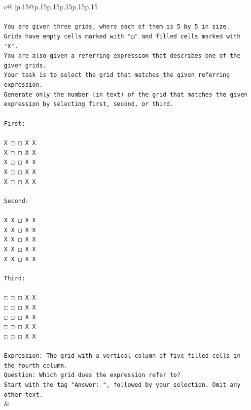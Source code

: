 \documentclass{article}
\begin{document}
{\begin{supertabular}{c@{$\;$}|p{.15\linewidth}@{}p{.15\linewidth}p{.15\linewidth}p{.15\linewidth}p{.15\linewidth}p{.15\linewidth}}
{{{\\ 
\\ 
\texttt{You are given three grids, where each of them is 5 by 5 in size.} \\
\texttt{Grids have empty cells marked with "▢" and filled cells marked with "X".} \\
\texttt{You are also given a referring expression that describes one of the given grids.} \\
\texttt{Your task is to select the grid that matches the given referring expression.} \\
\texttt{Generate only the number (in text) of the grid that matches the given expression by selecting first, second, or third.} \\
\\ 
\texttt{First:} \\
\\ 
\texttt{X □ □ X X} \\
\texttt{X □ □ X X} \\
\texttt{X □ □ X X} \\
\texttt{X □ □ X X} \\
\texttt{X □ □ X X} \\
\\ 
\texttt{Second:} \\
\\ 
\texttt{X X □ X X} \\
\texttt{X X □ X X} \\
\texttt{X X □ X X} \\
\texttt{X X □ X X} \\
\texttt{X X □ X X} \\
\\ 
\texttt{Third:} \\
\\ 
\texttt{□ □ □ X X} \\
\texttt{□ □ □ X X} \\
\texttt{□ □ □ X X} \\
\texttt{□ □ □ X X} \\
\texttt{□ □ □ X X} \\
\\ 
\texttt{Expression: The grid with a vertical column of five filled cells in the fourth column.} \\
\texttt{Question: Which grid does the expression refer to?} \\
\texttt{Start with the tag "Answer: ", followed by your selection. Omit any other text.} \\
            }
        }
    }
    & \\ \\


\end{supertabular}}
\end{document}
